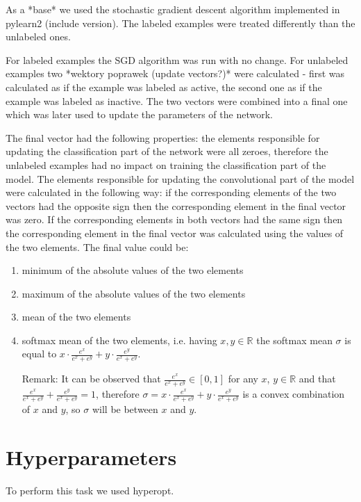 \documentclass[a4paper,10pt]{report}
\begin{document}
      As a *base* we used the stochastic gradient descent algorithm implemented in pylearn2 (include version). The labeled examples were treated differently than the unlabeled ones.
      
      For labeled examples the SGD algorithm was run with no change. For unlabeled examples two *wektory poprawek (update vectors?)* were calculated - first was calculated as if the example was labeled as active, the second one as if the example was labeled as inactive. The two vectors were combined into a final one which was later used to update the parameters of the network.
      
      The final vector had the following properties: the elements responsible for updating the classification part of the network were all zeroes, therefore the unlabeled examples had no impact on training the classification part of the model. The elements responsible for updating the convolutional part of the model were calculated in the following way: if the corresponding elements of the two vectors had the opposite sign then the corresponding element in the final vector was zero. If the corresponding elements in both vectors had the same sign then the corresponding element in the final vector was calculated using the values of the two elements. The final value could be:
      \begin{enumerate}
       \item minimum of the absolute values of the two elements
       \item maximum of the absolute values of the two elements
       \item mean of the two elements
       \item softmax mean of the two elements, i.e. having $x, y \in \mathbb{R}$ the softmax mean $\sigma$ is equal to $x \cdot \frac{e^x}{e^x + e^y} + y \cdot \frac{e^y}{e^x + e^y}$.
       
       Remark: It can be observed that $\frac{e^x}{e^x + e^y} \in [0, 1]$ for any $x$, $y \in \mathbb{R}$ and that $\frac{e^x}{e^x + e^y} + \frac{e^y}{e^x + e^y} = 1$, therefore $\sigma = x \cdot \frac{e^x}{e^x + e^y} + y \cdot \frac{e^y}{e^x + e^y}$ is a convex combination of $x$ and $y$, so $\sigma$ will be between $x$ and $y$.
      \end{enumerate}

	
      \section{Hyperparameters}
      To perform this task we used hyperopt.
      
\end{document}
